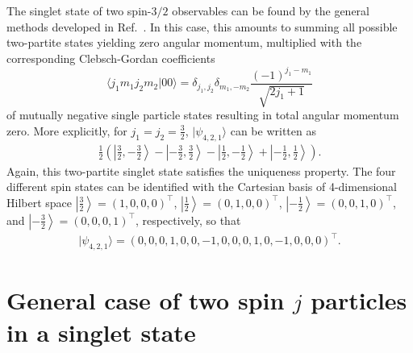The singlet state of two spin-$3/2$ observables
can be found by the general methods developed in Ref.~\cite{schimpf-svozil}.
In this case, this amounts to summing all possible two-partite states yielding zero angular momentum,
multiplied with the corresponding  Clebsch-Gordan coefficients
\begin{equation}
\langle j_1m_1j_2m_2\vert 00\rangle = \delta_{j_1,j_2}  \delta_{m_1,-m_2} \frac{(-1)^{j_1-m_1}}{\sqrt{2j_1+1}}
\label{2009-gtq-cgordon0}
\end{equation}
of mutually negative single particle states resulting in total angular momentum zero.
More explicitly,  for $j_1=j_2=\frac{3}{2}$,
$\vert \psi_{4,2,1} \rangle  $ can be written as
\begin{equation}
\begin{split}
\frac{1}{2} \left(
\left| \left. \frac{3}{2}, -\frac{3}{2}\right\rangle \right.
 - \left| \left.  -\frac{3}{2}, \frac{3}{2}\right\rangle    \right.
- \left| \left.  \frac{1}{2}, -\frac{1}{2}\right\rangle  \right.
+ \left| \left.  -\frac{1}{2}, \frac{1}{2}\right\rangle   \right.
\right).
\end{split}
\end{equation}
Again, this two-partite singlet state satisfies the uniqueness property.
The four different spin states can be identified with the Cartesian basis of 4-dimensional Hilbert space
$\left| \left. \frac{3}{2}\right\rangle \right. =
\left( 1,0,0,0\right)^\intercal$,
$\left| \left. \frac{1}{2}\right\rangle \right. = \left(0,1,0,0\right)^\intercal$,
$\left| \left. -\frac{1}{2}\right\rangle \right. = \left(0,0,1,0\right)^\intercal$,
and
$\left| \left. -\frac{3}{2}\right\rangle \right. = \left(0,0,0,1\right)^\intercal$,
respectively, so that
\begin{equation}
\begin{split}
\vert \psi_{4,2,1} \rangle
=
\left( 0,0,0,1,0,0,-1,0,0,0,1,0,-1,0,0,0\right)^\intercal
.
\end{split}
\end{equation}


\section{General case of two spin $j$ particles in a singlet state}

